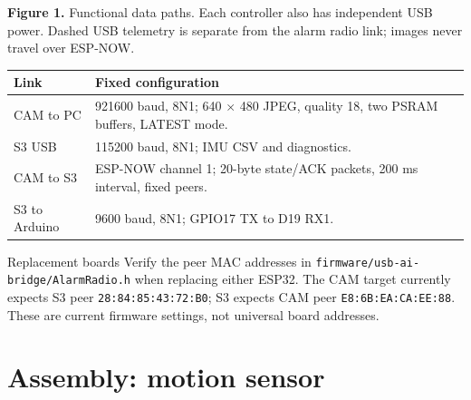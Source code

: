 \documentclass[11pt,a4paper]{article}
\newcommand{\file}[1]{\nolinkurl{#1}}
\newcommand{\page}[1]{\clearpage\section{#1}}
\begin{document}
\begin{center}
\end{center}
\textbf{Figure 1.} Functional data paths. Each controller also has independent USB power. Dashed USB telemetry is separate from the alarm radio link; images never travel over ESP-NOW.
\par\begin{tabularx}{\linewidth}{@{}l X@{}}\toprule
Link & Fixed configuration\\\midrule
CAM to PC & 921600 baud, 8N1; 640 $\times$ 480 JPEG, quality 18, two PSRAM buffers, LATEST mode.\\
S3 USB & 115200 baud, 8N1; IMU CSV and diagnostics.\\
CAM to S3 & ESP-NOW channel 1; 20-byte state/ACK packets, 200 ms interval, fixed peers.\\
S3 to Arduino & 9600 baud, 8N1; GPIO17 TX to D19 RX1.\\\bottomrule
\end{tabularx}
\begin{note}{Replacement boards}
Verify the peer MAC addresses in \file{firmware/usb-ai-bridge/AlarmRadio.h} when replacing either ESP32. The CAM target currently expects S3 peer \file{28:84:85:43:72:B0}; S3 expects CAM peer \file{E8:6B:EA:CA:EE:88}. These are current firmware settings, not universal board addresses.
\end{note}
\page{Assembly: motion sensor}
\end{document}
